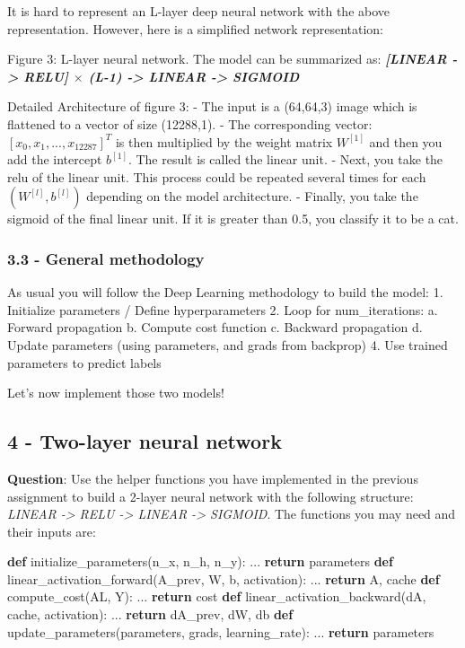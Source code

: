\documentclass[11pt]{article}
\newenvironment{Shaded}{}{}
\newcommand{\KeywordTok}[1]{\textcolor[rgb]{0.00,0.44,0.13}{\textbf{{#1}}}}
\newcommand{\NormalTok}[1]{{#1}}
\newcommand{\ControlFlowTok}[1]{\textcolor[rgb]{0.00,0.44,0.13}{\textbf{{#1}}}}
\begin{document}
It is hard to represent an L-layer deep neural network with the above
representation. However, here is a simplified network representation:

Figure 3: L-layer neural network. The model can be summarized as:
\textbf{\emph{{[}LINEAR -\textgreater{} RELU{]} \(\times\) (L-1)
-\textgreater{} LINEAR -\textgreater{} SIGMOID}}

Detailed Architecture of figure 3: - The input is a (64,64,3) image
which is flattened to a vector of size (12288,1). - The corresponding
vector: \([x_0,x_1,...,x_{12287}]^T\) is then multiplied by the weight
matrix \(W^{[1]}\) and then you add the intercept \(b^{[1]}\). The
result is called the linear unit. - Next, you take the relu of the
linear unit. This process could be repeated several times for each
\((W^{[l]}, b^{[l]})\) depending on the model architecture. - Finally,
you take the sigmoid of the final linear unit. If it is greater than
0.5, you classify it to be a cat.

\subsubsection{3.3 - General methodology}\label{general-methodology}

As usual you will follow the Deep Learning methodology to build the
model: 1. Initialize parameters / Define hyperparameters 2. Loop for
num\_iterations: a. Forward propagation b. Compute cost function c.
Backward propagation d. Update parameters (using parameters, and grads
from backprop) 4. Use trained parameters to predict labels

Let's now implement those two models!

    \subsection{4 - Two-layer neural
network}\label{two-layer-neural-network}

\textbf{Question}: Use the helper functions you have implemented in the
previous assignment to build a 2-layer neural network with the following
structure: \emph{LINEAR -\textgreater{} RELU -\textgreater{} LINEAR
-\textgreater{} SIGMOID}. The functions you may need and their inputs
are:

\begin{Shaded}
\begin{Highlighting}[]
\KeywordTok{def}\NormalTok{ initialize_parameters(n_x, n_h, n_y):}
\NormalTok{    ...}
    \ControlFlowTok{return}\NormalTok{ parameters }
\KeywordTok{def}\NormalTok{ linear_activation_forward(A_prev, W, b, activation):}
\NormalTok{    ...}
    \ControlFlowTok{return}\NormalTok{ A, cache}
\KeywordTok{def}\NormalTok{ compute_cost(AL, Y):}
\NormalTok{    ...}
    \ControlFlowTok{return}\NormalTok{ cost}
\KeywordTok{def}\NormalTok{ linear_activation_backward(dA, cache, activation):}
\NormalTok{    ...}
    \ControlFlowTok{return}\NormalTok{ dA_prev, dW, db}
\KeywordTok{def}\NormalTok{ update_parameters(parameters, grads, learning_rate):}
\NormalTok{    ...}
    \ControlFlowTok{return}\NormalTok{ parameters}
\end{Highlighting}
\end{Shaded}
\end{document}
